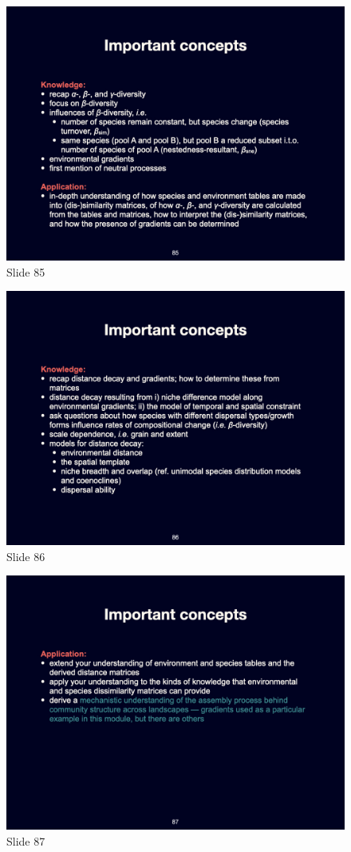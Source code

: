\documentclass[
  11pt,
]{book}
\begin{document}
\begin{figure}[ht]
\centering
\includegraphics[width=0.8\linewidth]{../images/BDC334/BDC334-085.jpeg}
\caption*{Slide 85}
\end{figure}

\begin{figure}[ht]
\centering
\includegraphics[width=0.8\linewidth]{../images/BDC334/BDC334-086.jpeg}
\caption*{Slide 86}
\end{figure}

\begin{figure}[ht]
\centering
\includegraphics[width=0.8\linewidth]{../images/BDC334/BDC334-087.jpeg}
\caption*{Slide 87}
\end{figure}
\end{document}
